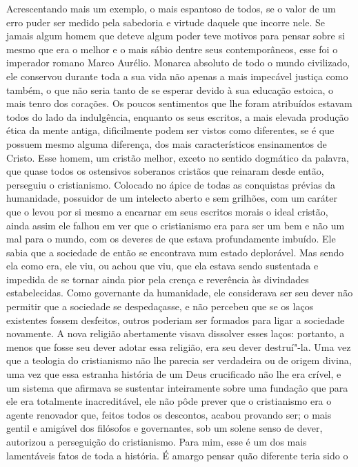 Acrescentando mais um exemplo, o mais espantoso de todos, se o valor de um
erro puder ser medido pela sabedoria e virtude daquele que incorre nele. Se
jamais algum homem que deteve algum poder teve motivos para pensar
sobre si mesmo que era o melhor e o mais sábio dentre seus
contemporâneos, esse foi o imperador romano Marco Aurélio. Monarca
absoluto de todo o mundo civilizado, ele conservou durante toda a sua
vida não apenas a mais impecável justiça como também, o que não seria
tanto de se esperar devido à sua educação estoica, o mais tenro dos
corações. Os poucos sentimentos que lhe foram atribuídos estavam todos
do lado da indulgência, enquanto os seus escritos, a mais elevada
produção ética da mente antiga, dificilmente podem ser vistos como
diferentes, se é que possuem mesmo alguma diferença, dos mais
característicos ensinamentos de Cristo. Esse homem, um cristão melhor, 
exceto no sentido dogmático da palavra, que quase todos os
ostensivos soberanos cristãos que reinaram desde então, perseguiu o
cristianismo. Colocado no ápice de todas as conquistas prévias da
humanidade, possuidor de um intelecto aberto e sem grilhões, com um
caráter que o levou por si mesmo a encarnar em seus escritos morais o
ideal cristão, ainda assim ele falhou em ver que o cristianismo era
para ser um bem e não um mal para o mundo, com os deveres de que estava profundamente 
imbuído. Ele sabia que a sociedade de então se encontrava num estado deplorável. 
Mas sendo ela como era, ele viu, ou achou que viu, que ela estava sendo 
sustentada e impedida de se tornar ainda pior pela crença e reverência às divindades
estabelecidas. Como governante da humanidade, ele considerava ser seu
dever não permitir que a sociedade se despedaçasse, e não percebeu que se
os laços existentes fossem desfeitos, outros poderiam ser formados 
para ligar a sociedade novamente. A nova religião abertamente visava
dissolver esses laços: portanto, a menos que fosse seu dever adotar
essa religião, era seu dever destruí"-la. Uma vez que a
teologia do cristianismo não lhe parecia ser verdadeira ou de origem
divina, uma vez que essa estranha história de um Deus crucificado não lhe
era crível, e um sistema que afirmava se sustentar inteiramente sobre
uma fundação que para ele era totalmente inacreditável, ele não pôde
prever que o cristianismo era o agente renovador que, feitos todos
os descontos, acabou provando ser; o mais gentil e amigável dos
filósofos e governantes, sob um solene senso de dever, autorizou a
perseguição do cristianismo. Para mim, esse é um dos mais lamentáveis
fatos de toda a história. É amargo pensar quão diferente teria sido o
